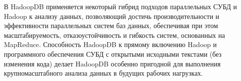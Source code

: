 В HadoopDB применяется некоторый гибрид подходов параллельных СУБД и Hadoop к анализу данных, позволяющий достичь производительности
и эффективности параллельных систем баз данных, обеспечивая при этом масштабируемость, отказоустойчивость и гибкость систем,
основанных на MapReduce. Способность HadoopDB к прямому включению Hadoop и программного обеспечения СУБД с открытыми исходными
текстами (без изменения кода) делает HadoopDB особенно пригодной для выполнения крупномасштабного анализа данных в будущих
рабочих нагрузках.